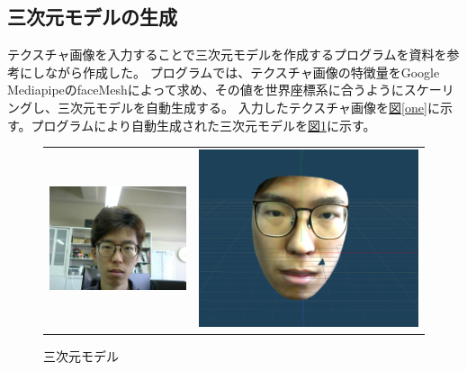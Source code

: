 \documentclass[]{jarticle}          %
\begin{document}
\subsection{三次元モデルの生成}
テクスチャ画像を入力することで三次元モデルを作成するプログラムを資料\cite{bib_1}を参考にしながら作成した。
プログラムでは、テクスチャ画像の特徴量をGoogle MediapipeのfaceMeshによって求め、その値を世界座標系に合うようにスケーリングし、三次元モデルを自動生成する。
入力したテクスチャ画像を\hyperref[one]{図\ref{one}}に示す。プログラムにより自動生成された三次元モデルを\hyperref[two]{図\ref{two}}に示す。
\begin{figure}[!ht]
  \begin{tabular}{cc}
    \begin{minipage}[t]{0.45\hsize}
      \centering
      \includegraphics[keepaspectratio, scale=0.27]{figures/texture.png}
      \caption{テクスチャ画像}
      \label{one}
    \end{minipage} &
    \begin{minipage}[t]{0.45\hsize}
      \centering
      \includegraphics[keepaspectratio, scale=0.2]{figures/3dmodel.png}
      \caption{三次元モデル}
      \label{two}
    \end{minipage}
  \end{tabular}
\end{figure}
\end{document}
